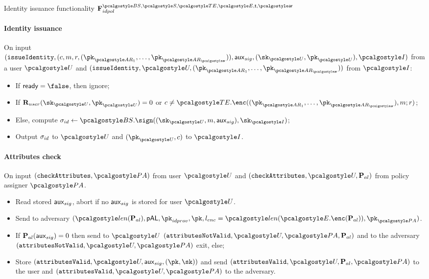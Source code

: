 \documentclass[runningheads,10pt]{llncs}
\numberwithin{equation}{section}
\begin{document}
\begin{funcbox}{Identity issuance functionality
    $\func{idpol}^{\BSIG, \SIG, \TENC, \ENC, \thresholdar, \noofar}$}
\paragraph{Identity issuance}
On input
$(\issueIdentity, (c, m, r, (\pk_{\ar_1}, \ldots, \pk_{\ar_\noofar})), \aux_{sig},
(\sk_{\user}, \pk_{\user}), \idprov)$ from a user $\user$ and
$(\issueIdentity, \user, (\pk_{\ar_1}, \ldots, \pk_{\ar_\noofar}))$ from $\idprov$:
\begin{itemize}
\item If $\flag{ready} = \false$, then ignore;
\item If $\REL_{user}(\sk_{\user}, \pk_{\user}) = 0$ or
  $c \neq \TENC.\enc((\pk_{\ar_1}, \ldots, \pk_{\ar_\noofar}), m; r)$;
\item Else, compute
  $\signature_{id} \gets \BSIG.\sign((\sk_{\user}, m, \aux_{sig}), \sk_{\idprov})$;
\item Output $\sigma_{id}$ to $\user$ and $(\pk_{\user}, c)$ to
  $\idprov$.
  \end{itemize}

 \paragraph{Attributes check}
 On input $(\checkAttributes, \polas)$ from user $\user$ and
 $(\checkAttributes, \user, \alpolicy)$ from policy assigner $\polas$.
 \begin{itemize}
 \item Read stored $\mathsf{aux}_{sig}$, abort if no $\mathsf{aux}_{sig}$ is stored for user $\user$.
 \item Send to adversary $(\length{\alpolicy}, \pAL, \pk_{idprov}, \pk, l_{enc} =
   \length{\ENC.\enc(\alpolicy)}, \pk_{\polas})$.
 \item If $\mathbf{P}_{al} (\mathsf{aux}_{sig}) = 0$ then send to $\user$
   $(\attributesNotValid, \user, \polas, \alpolicy)$ and to the adversary
   $(\attributesNotValid, \user, \polas)$ exit, else;
 \item Store $(\attributesValid, \user, \aux_{sig}, (\pk, \sk))$ and send
   $(\attributesValid, \user, \alpolicy, \polas)$ to the user and
   $(\attributesValid,  \user, \polas)$ to the adversary. 
 \end{itemize}


\end{funcbox}
\end{document}
